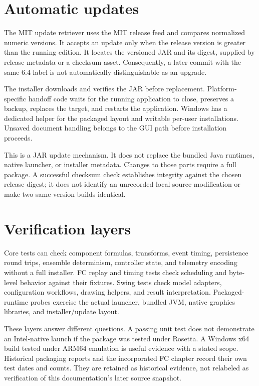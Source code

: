 \section{Automatic updates}
The MIT update retriever uses the MIT release feed and compares normalized numeric versions. It accepts an update only when the release version is greater than the running edition. It locates the versioned JAR and its digest, supplied by release metadata or a checksum asset. Consequently, a later commit with the same 6.4 label is not automatically distinguishable as an upgrade.

The installer downloads and verifies the JAR before replacement. Platform-specific handoff code waits for the running application to close, preserves a backup, replaces the target, and restarts the application. Windows has a dedicated helper for the packaged layout and writable per-user installations. Unsaved document handling belongs to the GUI path before installation proceeds.

This is a JAR update mechanism. It does not replace the bundled Java runtimes, native launcher, or installer metadata. Changes to those parts require a full package. A successful checksum check establishes integrity against the chosen release digest; it does not identify an unrecorded local source modification or make two same-version builds identical.


\section{Verification layers}
Core tests can check component formulas, transforms, event timing, persistence round trips, ensemble determinism, controller state, and telemetry encoding without a full installer. FC replay and timing tests check scheduling and byte-level behavior against their fixtures. Swing tests check model adapters, configuration workflows, drawing helpers, and result interpretation. Packaged-runtime probes exercise the actual launcher, bundled JVM, native graphics libraries, and installer/update layout.

These layers answer different questions. A passing unit test does not demonstrate an Intel-native launch if the package was tested under Rosetta. A Windows x64 build tested under ARM64 emulation is useful evidence with a stated scope. Historical packaging reports and the incorporated FC chapter record their own test dates and counts. They are retained as historical evidence, not relabeled as verification of this documentation's later source snapshot.

